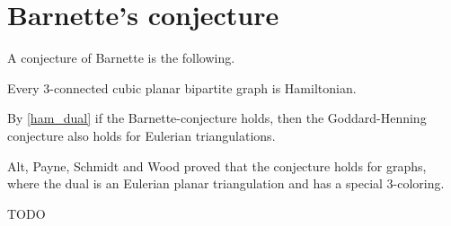 \section{Barnette's conjecture}

A conjecture of Barnette \cite{barnette} is the following.
\begin{conj}
  Every $3$-connected cubic planar bipartite graph is Hamiltonian.
\end{conj}

By \ref{ham_dual} if the Barnette-conjecture holds, then the Goddard-Henning
conjecture also holds for Eulerian triangulations.

Alt, Payne, Schmidt and Wood \cite{spec_barnette} proved that the conjecture holds
for graphs, where the dual is an Eulerian planar triangulation and has a special $3$-coloring.

TODO
